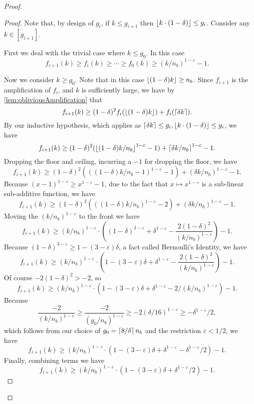 \begin{proof}
\begin{proof}
  Note that, by design of $g_i$, if $k \le g_{i+1}$ then $\left\lfloor k\cdot (1-\delta) \right\rfloor \le g_i$.
  Consider any $k\in [g_{i+1}]$. 

  First we deal with the trivial
  case where $k \le g_0$. In this case
  $$f_{i+1}(k) \ge f_i(k) \ge \cdots \ge f_0(k) \ge (k/n_b)^{1-\varepsilon} -1.$$

  Now we consider $k \ge g_0$. Note that in this case $\left\lfloor (1-\delta)k \right\rfloor \ge n_b$.
  Since $f_{i+1}$ is the amplification of $f_i$, and $k$ is sufficiently large, we have by \cref{lem:obliviousAmplification} that
  $$f_{i+1}(k) \ge (1-\delta)^2 f_i(\left\lfloor (1-\delta)k \right\rfloor) + f_i(\left\lceil \delta k \right\rceil).$$
  By our inductive hypothesis, which applies as $\left\lceil \delta k \right\rceil\le g_i, \left\lfloor k\cdot (1-\delta) \right\rfloor \le g_i$, we have
  $$f_{i+1}(k) \ge (1-\delta)^2 (\left\lfloor (1-\delta)k/n_b \right\rfloor^{1-\varepsilon}-1) + \left\lceil \delta k/n_b \right\rceil^{1-\varepsilon} - 1. $$
  Dropping the floor and ceiling, incurring a $-1$ for dropping the floor, we have
  $$f_{i+1}(k) \ge (1-\delta)^2 (((1-\delta)k/n_b-1)^{1-\varepsilon}-1) + (\delta k/n_b)^{1-\varepsilon} - 1.$$
  Because $(x-1)^{1-\varepsilon} \ge x^{1-\varepsilon} -1$, due to the
  fact that $x\mapsto x^{1-\varepsilon}$ is a sub-linear
  sub-additive function, we have 
  $$f_{i+1}(k) \ge (1-\delta)^2 (((1-\delta)k/n_b)^{1-\varepsilon}-2) + (\delta k/n_b)^{1-\varepsilon}-1.$$
  Moving the $(k/n_b)^{1-\varepsilon}$ to the front we have
  $$ f_{i+1}(k) \ge (k/n_b)^{1-\varepsilon} \cdot\left((1-\delta)^{3-\varepsilon} + \delta^{1-\varepsilon} - \frac{2(1-\delta)^2}{(k/n_b)^{1-\varepsilon}} \right) -1.$$
  Because $(1-\delta)^{3-\varepsilon} \ge 1-(3-\varepsilon)\delta$, a fact called Bernoulli's Identity, we have
  $$f_{i+1}(k) \ge (k/n_b)^{1-\varepsilon} \cdot\left(1-(3-\varepsilon)\delta + \delta^{1-\varepsilon} - \frac{2(1-\delta)^2}{(k/n_b)^{1-\varepsilon}} \right)-1.$$
  Of course $-2(1-\delta)^2 > -2$, so 
  $$f_{i+1}(k) \ge (k/n_b)^{1-\varepsilon} \cdot\left(1-(3-\varepsilon)\delta + \delta^{1-\varepsilon} - 2/(k/n_b)^{1-\varepsilon} \right) -1.$$
  Because $$\frac{-2}{(k/n_b)^{1-\varepsilon}} \ge \frac{-2}{(g_0/n_b)^{1-\varepsilon}} \ge -2(\delta/16)^{1-\varepsilon} \ge -\delta^{1-\varepsilon}/2,$$
  which follows from our choice of $g_0 = \left\lceil 8/\delta \right\rceil n_b$ and the restriction
  $\varepsilon<1/2$, we have 
  $$f_{i+1}(k) \ge (k/n_b)^{1-\varepsilon} \cdot\left(1-(3-\varepsilon)\delta + \delta^{1-\varepsilon} - \delta^{1-\varepsilon}/2 \right)-1.$$
  Finally, combining terms we have
  $$f_{i+1}(k) \ge  (k/n_b)^{1-\varepsilon} \cdot\left(1-(3-\varepsilon)\delta + \delta^{1-\varepsilon}/2\right)-1. $$


\end{proof}
\end{proof}
